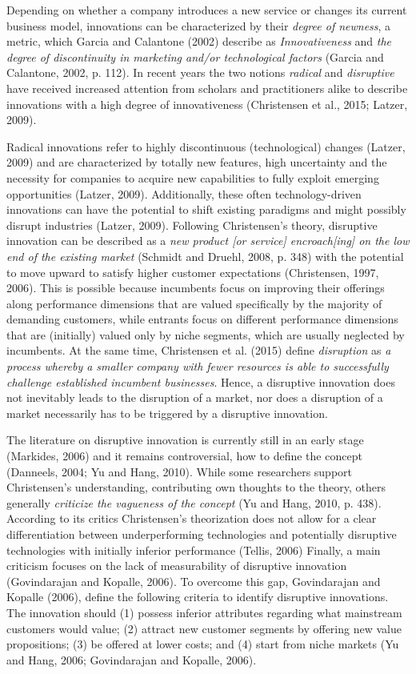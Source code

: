 Depending on whether a company introduces a new service or changes its current 
business model, innovations can be characterized by their \emph{degree of newness}, 
a metric, which Garcia and Calantone (2002) describe as \emph{Innovativeness} and 
\emph{the degree of discontinuity in marketing and/or technological factors} (Garcia 
and Calantone, 2002, p. 112). In recent years the two notions \emph{radical} and \emph{disruptive}
have received increased attention from scholars and practitioners alike to describe 
innovations with a high degree of innovativeness (Christensen et al., 2015; Latzer, 
2009). 

Radical innovations refer to highly discontinuous (technological) changes (Latzer, 
2009) and are characterized by totally new features, high uncertainty and the necessity 
for companies to acquire new capabilities to fully exploit emerging opportunities 
(Latzer, 2009). Additionally, these often technology-driven innovations can have 
the potential to shift existing paradigms and might possibly disrupt industries 
(Latzer, 2009). Following Christensen's theory, disruptive innovation can be described 
as a \emph{new product [or service] encroach[ing] on the low end of the existing market} 
(Schmidt and Druehl, 2008, p. 348) with the potential to move upward to satisfy 
higher customer expectations (Christensen, 1997, 2006). This is possible because 
incumbents focus on improving their offerings along performance dimensions that 
are valued specifically by the majority of demanding customers, while entrants 
focus on different performance dimensions that are (initially) valued only by niche 
segments, which are usually neglected by incumbents. At the same time, Christensen 
et al. (2015) define \emph{disruption} as \emph{a process whereby a smaller company with 
fewer resources is able to successfully challenge established incumbent businesses}. 
Hence, a disruptive innovation does not inevitably leads to the disruption of a 
market, nor does a disruption of a market necessarily has to be triggered by a 
disruptive innovation. 

The literature on disruptive innovation is currently still in an early stage (Markides, 
2006) and it remains controversial, how to define the concept (Danneels, 2004; 
Yu and Hang, 2010). While some researchers support Christensen's understanding, 
contributing own thoughts to the theory, others generally \emph{criticize the vagueness 
of the concept} (Yu and Hang, 2010, p. 438). According to its critics Christensen's 
theorization does not allow for a clear differentiation between underperforming 
technologies and potentially disruptive technologies with initially inferior performance 
(Tellis, 2006) Finally, a main criticism focuses on the lack of measurability of 
disruptive innovation (Govindarajan and Kopalle, 2006). To overcome this gap, Govindarajan 
and Kopalle (2006), define the following criteria to identify disruptive innovations. 
The innovation should (1) possess inferior attributes regarding what mainstream 
customers would value; (2) attract new customer segments by offering new value 
propositions; (3) be offered at lower costs; and (4) start from niche markets (Yu 
and Hang, 2006; Govindarajan and Kopalle, 2006).


